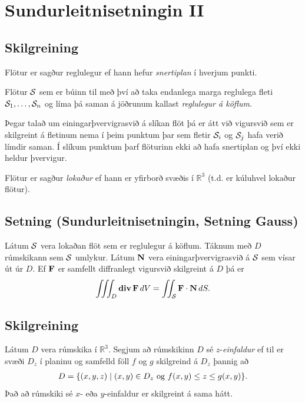 \documentclass[a4paper,10pt,icelandic]{sphinxmanual}
\begin{document}
\section{Sundurleitnisetningin II}
\label{Kafli6:sundurleitnisetningin-ii}

\subsection{Skilgreining}
\label{Kafli6:index-5}\label{Kafli6:id8}
Flötur er sagður reglulegur ef hann hefur \textit{snertiplan} í hverjum punkti.

Flötur \(\cal S\) sem er búinn til með því að taka endanlega marga
reglulega fleti \({\cal S}_1, \ldots, {\cal S}_n\) og líma þá saman
á jöðrunum kallast \emph{reglulegur á köflum}.

Þegar talað um einingarþvervigrasvið á slíkan flöt þá er átt við
vigursvið sem er skilgreint á fletinum nema í þeim punktum þar sem
fletir \({\cal S}_i\) og \({\cal S}_j\) hafa verið límdir saman.
Í slíkum punktum þarf flöturinn ekki að hafa snertiplan og því ekki
heldur þvervigur.

Flötur er sagður \emph{lokaður} ef hann er yfirborð svæðis í
\({\mathbb  R}^3\) (t.d. er kúluhvel lokaður flötur).


\subsection{Setning (Sundurleitnisetningin, Setning Gauss)}
\label{Kafli6:setning-sundurleitnisetningin-setning-gauss}
Látum \(\cal S\) vera lokaðan flöt sem er reglulegur á köflum.
Táknum með \(D\) rúmskikann sem \(\cal S\) umlykur. Látum
\(\mbox{${\bf N}$}\) vera einingarþvervigrasvið á \(\cal S\) sem
vísar út úr \(D\). Ef \(\mbox{${\bf F}$}\) er samfellt
diffranlegt vigursvið skilgreint á \(D\) þá er
\begin{gather}
\begin{split}\displaystyle \int\!\!\!\int\!\!\!\int_D \mbox{${\rm\bf div\,}$}\mbox{${\bf F}$}\,dV=\int\!\!\!\int_{\cal S} \mbox{${\bf F}$}\cdot\mbox{${\bf N}$}\,dS.\end{split}\notag
\end{gather}

\subsection{Skilgreining}
\label{Kafli6:id9}
Látum \(D\) vera rúmskika í \({\mathbb  R}^3\). Segjum að
rúmskikinn \(D\) sé \(z\)-\emph{einfaldur} ef til er svæði
\(D_z\) í planinu og samfelld föll \(f\) og \(g\) skilgreind
á \(D_z\) þannig að
\begin{gather}
\begin{split}\displaystyle D=\{(x,y,z)\mid (x,y)\in D_z\mbox{ og }f(x,y)\leq z\leq g(x,y)\}.\end{split}\notag
\end{gather}
Það að rúmskiki sé \(x\)- eða \(y\)-einfaldur er skilgreint á
sama hátt.
\end{document}
